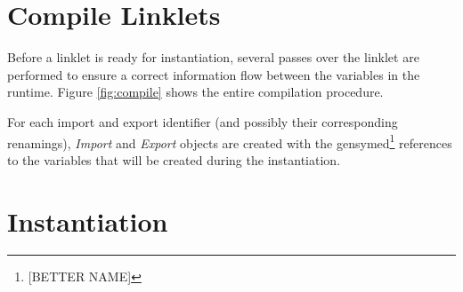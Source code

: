 \documentclass[sigplan,screen,anonymous]{acmart}
\def\dash {\text{-}}
\begin{document}
\section{Compile Linklets}

Before a linklet is ready for instantiation, several passes over the
linklet are performed to ensure a correct information flow between the
variables in the run\dash time. Figure \ref{fig:compile} shows the
entire compilation procedure.

For each import and export identifier (and possibly their
corresponding renamings), \textit{Import} and \textit{Export} objects
are created with the gensymed\footnote{[BETTER NAME]} references to
the variables that will be created during the instantiation.





\section{Instantiation}

\newcommand{\redinput}[1]{EP\;\llbracket #1 \rrbracket, \rho, \sigma\;}
\newcommand{\redoutput}[3]{EP\;\llbracket #1 \rrbracket, #2, #3\;}

\newcommand{\rcinput}[1]{EP\;\llbracket E\;\llbracket #1 \rrbracket \rrbracket, \rho, \sigma\;}
\newcommand{\rcoutput}[3]{EP\;\llbracket E\;\llbracket #1 \rrbracket \rrbracket, #2, #3\;}
\def\rcrel {&\longrightarrow_{\beta r}\;}

\def\where {\textbf{where}\;}
\def\rel {&\longrightarrow_{\beta p}\;}
\end{document}

